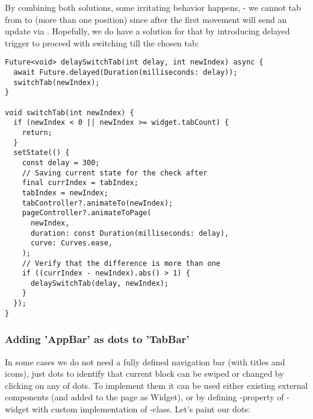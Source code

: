 By combining both solutions, some irritating behavior happens, - we cannot tab from  to  
(more than one position) since  after the first movement will send an update via . 
Hopefully, we do have a solution for that by introducing delayed trigger to proceed with switching till the chosen tab:

\begin{lstlisting}
Future<void> delaySwitchTab(int delay, int newIndex) async {
  await Future.delayed(Duration(milliseconds: delay));
  switchTab(newIndex);
}

void switchTab(int newIndex) {
  if (newIndex < 0 || newIndex >= widget.tabCount) {
    return;
  }
  setState(() {
    const delay = 300;
    // Saving current state for the check after 
    final currIndex = tabIndex;
    tabIndex = newIndex;
    tabController?.animateTo(newIndex);
    pageController?.animateToPage(
      newIndex,
      duration: const Duration(milliseconds: delay),
      curve: Curves.ease,
    );
    // Verify that the difference is more than one
    if ((currIndex - newIndex).abs() > 1) {
      delaySwitchTab(delay, newIndex);
    }
  });
}
\end{lstlisting}


\subsubsection{Adding 'AppBar' as dots to 'TabBar'}

In some cases we do not need a fully defined navigation bar (with titles and icons), just dots to identify that
current block can be swiped or changed by clicking on any of dots. To implement them it can be used either existing 
external components (and added to the page as Widget), or by defining -property of -widget with
custom implementation of -class. Let's paint our dots:

